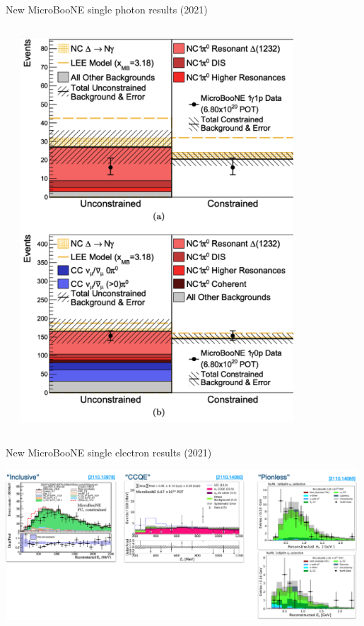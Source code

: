 \begin{frame}[t]{New MicroBooNE single photon results (2021)}
\begin{columns}[T]
\begin{column}{0.50\textwidth}
    \end{column}
    \begin{column}{0.50\textwidth}
    \begin{center}
      \includegraphics[width=0.80\textwidth]{./images/beyond3nu/accelerator/uB_2021_gamma_1}
    \end{center}
    \end{column}
\end{columns}

\end{frame}

%
%
%

\begin{frame}[t]{New MicroBooNE single electron results (2021)}

  \begin{center}
    \includegraphics[width=0.99\textwidth]{./images/beyond3nu/accelerator/uB_2021_e_x3}
  \end{center}

\end{frame}

